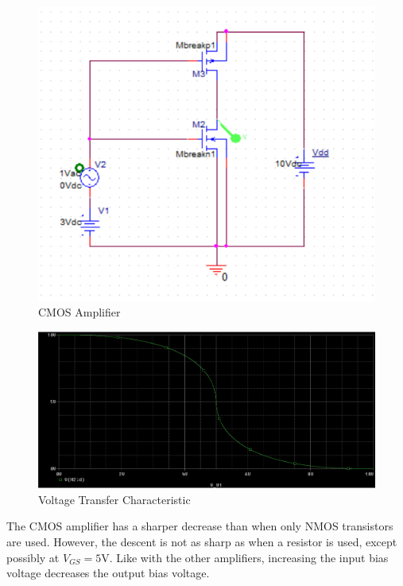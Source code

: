 \FloatBarrier

\begin{figure}[h!]
	\centering
	\includegraphics[scale=0.75]{./images/circuit4.PNG}
	\caption{CMOS Amplifier}
	\label{fig:circuit4}
\end{figure}

\FloatBarrier

\FloatBarrier

\begin{figure}[h!]
	\centering
	\includegraphics[scale=0.50]{./images/dc_sweep_vout_vs_vgs.PNG}
	\caption{Voltage Transfer Characteristic}
	\label{fig:dc_sweep_vout_vs_vgs}
\end{figure}

\FloatBarrier

The CMOS amplifier has a sharper decrease than when only NMOS transistors are used. However, the descent is not as sharp as when a resistor is used, except possibly at $V_{GS} = 5$\si{\volt}. Like with the other amplifiers, increasing the input bias voltage decreases the output bias voltage.
